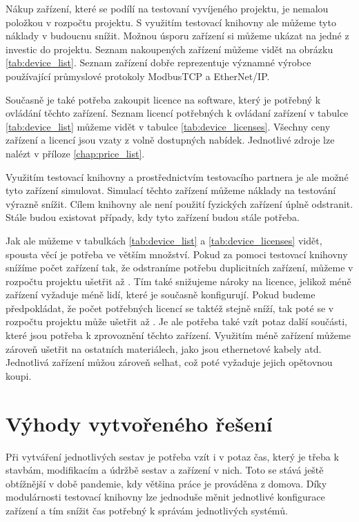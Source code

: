 Nákup zařízení, které se podílí na testovaní vyvíjeného projektu, je nemalou položkou v rozpočtu projektu. S využitím testovací knihovny ale můžeme tyto náklady v budoucnu snížit. Možnou úsporu zařízení si můžeme ukázat na jedné z investic do projektu. Seznam nakoupených zařízení můžeme vidět na obrázku \ref{tab:device_list}. Seznam zařízení dobře reprezentuje významné výrobce používající průmyslové protokoly ModbusTCP a EtherNet/IP.

Současně je také potřeba zakoupit licence na software, který je potřebný k ovládání těchto zařízení. Seznam licencí potřebných k ovládaní zařízení v tabulce \ref{tab:device_list} můžeme vidět v tabulce \ref{tab:device_licenses}. Všechny ceny zařízení a licencí jsou vzaty z volně dostupných nabídek. Jednotlivé zdroje lze nalézt v příloze \ref{chap:price_list}.

Využitím testovací knihovny a prostřednictvím testovacího partnera je ale možné tyto zařízení simulovat. Simulací těchto zařízení můžeme náklady na testování výrazně snížit. Cílem knihovny ale není použití fyzických zařízení úplně odstranit. Stále budou existovat případy, kdy tyto zařízení budou stále potřeba. 

Jak ale můžeme v tabulkách \ref{tab:device_list} a \ref{tab:device_licenses} vidět, spousta věcí je potřeba ve větším množství. Pokud za pomoci testovací knihovny snížíme počet zařízení tak, že odstraníme potřebu duplicitních zařízení, můžeme v rozpočtu projektu ušetřit až . Tím také snižujeme nároky na licence, jelikož méně zařízení vyžaduje méně lidí, které je současně konfigurují. Pokud budeme předpokládat, že počet potřebných licencí se taktéž stejně sníží, tak poté se v rozpočtu projektu může ušetřit až .
Je ale potřeba také vzít potaz další součásti, které jsou potřeba k zprovoznění těchto zařízení. Využitím méně zařízení můžeme zároveň ušetřit na ostatních materiálech, jako jsou ethernetové kabely atd. Jednotlivá zařízení můžou zároveň selhat, což poté vyžaduje jejich opětovnou koupi.

\section{Výhody vytvořeného řešení}
Při vytváření jednotlivých sestav je potřeba vzít i v potaz čas, který je třeba k stavbám, modifikacím a údržbě sestav a zařízení v nich. Toto se stává ještě obtížnější v době pandemie, kdy většina práce je prováděna z domova. Díky modulárnosti testovací knihovny lze jednoduše měnit jednotlivé konfigurace zařízení a tím snížit čas potřebný k správám jednotlivých systémů. 

